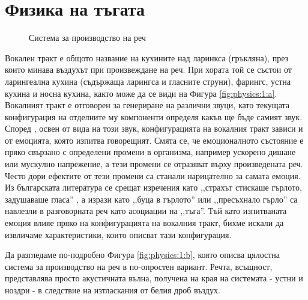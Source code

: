 \documentclass[main.tex]{subfiles}
\begin{document}
\section{Физика на тъгата}
    
    \begin{figure}[ht]%
        \centering
        \begin{changemargin}{0cm}{0cm} 
             \hspace{0.8cm}
        \end{changemargin} 
        \caption{Система за производство на реч}%
        \label{fig:physics:1}
    \end{figure}

    Вокален тракт е общото название на кухините над ларинкса (гръкляна), през които минава въздухът при произвеждане на реч.
    При хората той се състои от ларингеална кухина (съдържаща ларингса и гласните струни), фарингс, устна кухина и носна кухина, както може да се види на Фигура \autoref{fig:physics:1:a}. Вокалният тракт е отговорен за генериране на различни звуци, като текущата конфигурация на отделните му компоненти определя какъв ще бъде самият звук.
    Според \cite{emotional:shit}, освен от вида на този звук, конфигурацията на вокалния тракт зависи и от емоцията, която изпитва говорещият. Смята се, че емоционалното състояние е пряко свързано с определени промени в организма, например ускорено дишане или мускулно напрежение, а тези промени се отразяват върху произведената реч. Често дори ефектите от тези промени са станали нарицателно за самата емоция. Из българската литература се срещат изречения като ,,страхът стискаше гърлото, задушаваше гласа'' \cite{talev}, а изрази като ,,буца в гърлото'' или ,,пресъхнало гърло'' са навлезли в разговорната реч като асоциации на ,,тъга''. Тъй като изпитваната емоция влияе пряко на конфигурацията на вокалния тракт, бихме искали да извличаме характеристики, които описват тази конфигурация.
    
    Да разгледаме по-подробно Фигура \autoref{fig:physics:1:b}, която описва цялостна система за производство на реч в по-опростен вариант.
    Речта, всъщност, представлява просто акустичната вълна, получена на края на системата - устни и ноздри - в следствие на изтласкания от белия дроб въздух.
\end{document}
